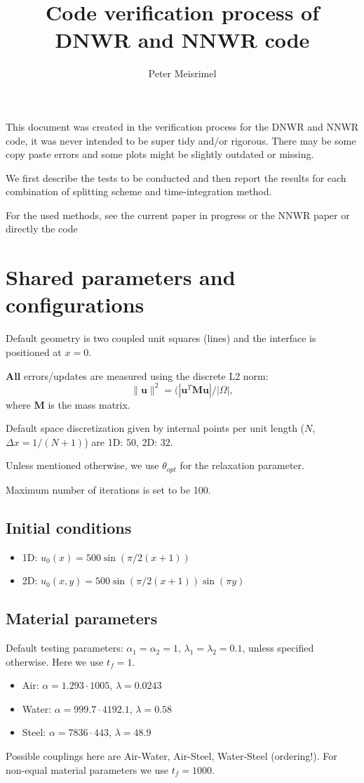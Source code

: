 \documentclass[a4paper,10pt]{article}
\title{Code verification process of DNWR and NNWR code}
\author{Peter Meisrimel}
\begin{document}
\maketitle

% 
This document was created in the verification process for the DNWR and NNWR code, it was never intended to be super tidy and/or rigorous. There may be some copy paste errors and some plots might be slightly outdated or missing.

We first describe the tests to be conducted and then report the results for each combination of splitting scheme and time-integration method.

For the used methods, see the current paper in progress or the NNWR paper or directly the code

\newpage
\tableofcontents
\listoftodos
\newpage

\section{Shared parameters and configurations}
Default geometry is two coupled unit squares (lines) and the interface is positioned at $x = 0$.

\textbf{All} errors/updates are measured using the discrete L2 norm:
% 
\begin{equation*}
\| \bm{u} \|^2 = (|\bm{u}^T \bm{M} \bm{u}|/|\Omega|,
\end{equation*}
% 
where $\bm{M}$ is the mass matrix.

Default space discretization given by internal points per unit length ($N$, $\Delta x = 1/(N+1)$) are 1D: $50$, 2D: $32$.

Unless mentioned otherwise, we use $\theta_{opt}$ for the relaxation parameter.

Maximum number of iterations is set to be 100.
% 
\subsection{Initial conditions}
% 
\begin{itemize}
\item 1D: $u_0(x) = 500\sin(\pi/2(x + 1))$
\item 2D: $u_0(x, y) = 500\sin(\pi/2(x + 1)) \sin(\pi y)$
\end{itemize}
% 
\subsection{Material parameters}
% 
Default testing parameters: $\alpha_1 = \alpha_2 = 1$, $\lambda_1 = \lambda_2 = 0.1$, unless specified otherwise. Here we use $t_f = 1$.
% 
\begin{itemize}
\item Air: $\alpha = 1.293\cdot1005$, $\lambda = 0.0243$
\item Water: $\alpha = 999.7\cdot4192.1
$, $\lambda = 0.58$
\item Steel: $\alpha = 7836\cdot443$, $\lambda = 48.9
$
\end{itemize}
% 
Possible couplings here are Air-Water, Air-Steel, Water-Steel (ordering!). For non-equal material parameters we use $t_f = 1000$.
% 
\end{document}
